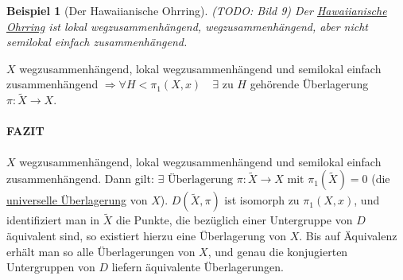 \documentclass[a4paper,11pt,notitlepage]{report}
\newtheorem{example}{Beispiel}[chapter]
\theoremstyle{definition}
\begin{document}
\begin{example}[Der Hawaiianische Ohrring]
	(TODO: Bild 9)
	Der \underline{Hawaiianische Ohrring} ist lokal wegzusammenhängend, wegzusammenhängend, aber nicht semilokal einfach zusammenhängend.
\end{example}

\begin{theorem}
	$X$ wegzusammenhängend, lokal wegzusammenhängend und semilokal einfach zusammenhängend
	\newline
	$\Rightarrow \forall H < \pi_1(X,x) \quad \exists$ zu $H$ gehörende Überlagerung $\pi \colon \widetilde{X} \rightarrow X.$
\end{theorem}

\paragraph{FAZIT} $X$ wegzusammenhängend, lokal wegzusammenhängend und semilokal einfach zusammenhängend. Dann gilt: 
\newline
$\exists \text{ Überlagerung } \pi \colon \widetilde{X} \rightarrow X \text{ mit } \pi_1(\widetilde{X}) = 0$ (die \underline{universelle Überlagerung} von $X$). $D(\widetilde{X},\pi)$ ist isomorph zu $\pi_1(X,x)$, und identifiziert man in $\widetilde{X}$ die Punkte, die bezüglich einer Untergruppe von $D$ äquivalent sind, so existiert hierzu eine Überlagerung von $X$. Bis auf Äquivalenz erhält man so alle Überlagerungen von $X$, und genau die konjugierten Untergruppen von $D$ liefern äquivalente Überlagerungen.
\end{document}
